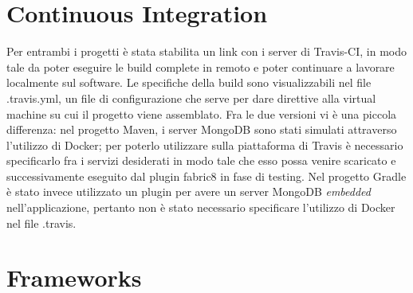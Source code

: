 \section{Continuous Integration}

Per entrambi i progetti è stata stabilita un link con i server di Travis-CI, in modo tale da poter eseguire le build complete in remoto e poter continuare a lavorare localmente sul software.\newline
Le specifiche della build sono visualizzabili nel file .travis.yml, un file di configurazione che serve per dare direttive alla virtual machine su cui il progetto viene assemblato.\newline
Fra le due versioni vi è una piccola differenza: nel progetto Maven, i server MongoDB sono stati simulati attraverso l'utilizzo di Docker; per poterlo utilizzare sulla piattaforma di Travis è necessario specificarlo fra i servizi desiderati in modo tale che esso possa venire scaricato e successivamente eseguito dal plugin fabric8 in fase di testing.\newline
Nel progetto Gradle è stato invece utilizzato un plugin per avere un server MongoDB \textsl{embedded} nell'applicazione, pertanto non è stato necessario specificare l'utilizzo di Docker nel file .travis.

\section{Frameworks}

